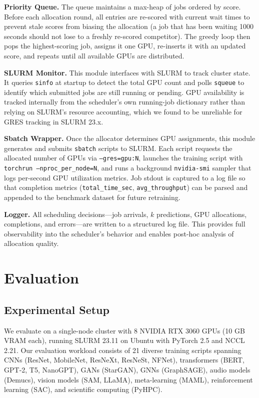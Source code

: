 \documentclass[letterpaper,10pt]{article}
\begin{document}
\textbf{Priority Queue.} The queue maintains a max-heap of jobs ordered by score. Before each allocation round, all entries are re-scored with current wait times to prevent stale scores from biasing the allocation (a job that has been waiting 1000 seconds should not lose to a freshly re-scored competitor). The greedy loop then pops the highest-scoring job, assigns it one GPU, re-inserts it with an updated score, and repeats until all available GPUs are distributed.

\textbf{SLURM Monitor.} This module interfaces with SLURM to track cluster state. It queries \texttt{sinfo} at startup to detect the total GPU count and polls \texttt{squeue} to identify which submitted jobs are still running or pending. GPU availability is tracked internally from the scheduler's own running-job dictionary rather than relying on SLURM's resource accounting, which we found to be unreliable for GRES tracking in SLURM 23.x.

\textbf{Sbatch Wrapper.} Once the allocator determines GPU assignments, this module generates and submits \texttt{sbatch} scripts to SLURM. Each script requests the allocated number of GPUs via \texttt{--gres=gpu:N}, launches the training script with \texttt{torchrun --nproc\_per\_node=N}, and runs a background \texttt{nvidia-smi} sampler that logs per-second GPU utilization metrics. Job stdout is captured to a log file so that completion metrics (\texttt{total\_time\_sec}, \texttt{avg\_throughput}) can be parsed and appended to the benchmark dataset for future retraining.

\textbf{Logger.} All scheduling decisions---job arrivals, $k$ predictions, GPU allocations, completions, and errors---are written to a structured log file. This provides full observability into the scheduler's behavior and enables post-hoc analysis of allocation quality.

\section{Evaluation}
\label{sec:evaluation}

\subsection{Experimental Setup}

We evaluate on a single-node cluster with 8 NVIDIA RTX 3060 GPUs (10 GB VRAM each), running SLURM 23.11 on Ubuntu with PyTorch 2.5 and NCCL 2.21. Our evaluation workload consists of 21 diverse training scripts spanning CNNs (ResNet, MobileNet, ResNeXt, ResNeSt, NFNet), transformers (BERT, GPT-2, T5, NanoGPT), GANs (StarGAN), GNNs (GraphSAGE), audio models (Demucs), vision models (SAM, LLaMA), meta-learning (MAML), reinforcement learning (SAC), and scientific computing (PyHPC).
\end{document}
